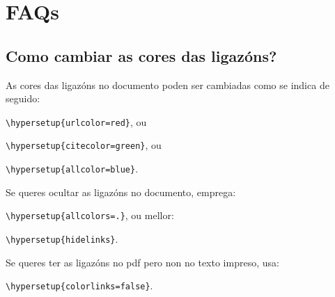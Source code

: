 
\chapter{FAQs} %

\label{ApendiceA} %

\section{Como cambiar as cores das ligazóns?}

As cores das ligazóns no documento poden ser cambiadas como se indica de seguido:

{\small\verb!\hypersetup{urlcolor=red}!}, ou

{\small\verb!\hypersetup{citecolor=green}!}, ou

{\small\verb!\hypersetup{allcolor=blue}!}.

\noindent Se queres ocultar as ligazóns no documento, emprega:

{\small\verb!\hypersetup{allcolors=.}!}, ou mellor: 

{\small\verb!\hypersetup{hidelinks}!}.

\noindent Se queres ter as ligazóns no pdf pero non no texto impreso, usa:

{\small\verb!\hypersetup{colorlinks=false}!}.
